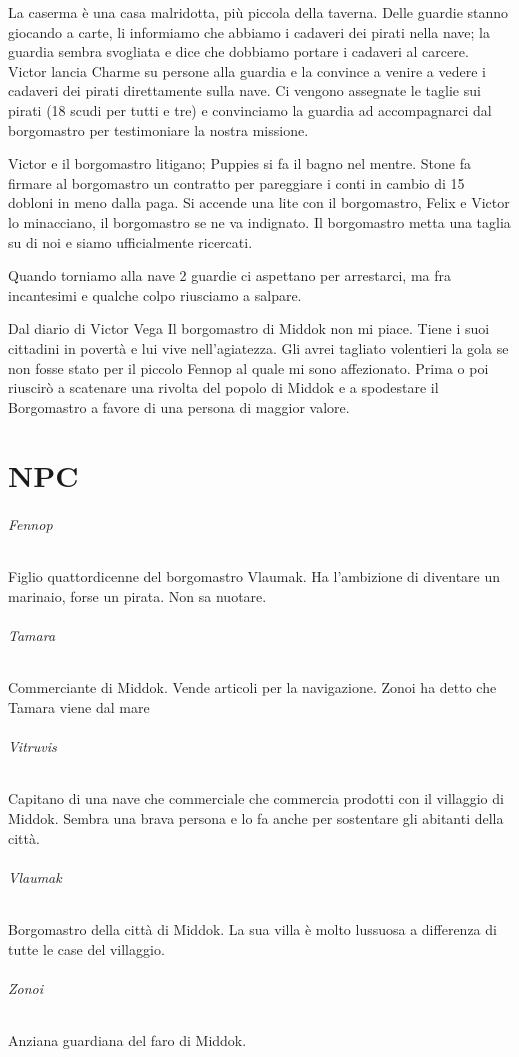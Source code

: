 \documentclass[letterpaper,twocolumn,openany, nodeprecatedcode, nomultitoc]{dndbook}
\begin{document}
La caserma è una casa malridotta, più piccola della taverna. Delle guardie stanno giocando a carte, li informiamo che abbiamo i cadaveri dei pirati nella nave; la guardia sembra svogliata e dice che dobbiamo portare i cadaveri al carcere. Victor lancia Charme su persone alla guardia e la convince a venire a vedere i cadaveri dei pirati direttamente sulla nave. Ci vengono assegnate le taglie sui pirati (18 scudi per tutti e tre) e convinciamo la guardia ad accompagnarci dal borgomastro per testimoniare la nostra missione.

Victor e il borgomastro litigano; Puppies si fa il bagno nel mentre. Stone fa firmare al borgomastro un contratto per pareggiare i conti in cambio di 15 dobloni in meno dalla paga. Si accende una lite con il borgomastro, Felix e Victor lo minacciano, il borgomastro se ne va indignato. Il borgomastro metta una taglia su di noi e siamo ufficialmente ricercati.

Quando torniamo alla nave 2 guardie ci aspettano per arrestarci, ma fra incantesimi e qualche colpo riusciamo a salpare.

\begin{DndComment}{Dal diario di Victor Vega}
Il borgomastro di Middok non mi piace. Tiene i suoi cittadini in povertà e lui vive nell'agiatezza. Gli avrei tagliato volentieri la gola se non fosse stato per il piccolo Fennop al quale mi sono affezionato. Prima o poi riuscirò a scatenare una rivolta del popolo di Middok e a spodestare il Borgomastro a favore di una persona di maggior valore.
\end{DndComment}


\chapter{NPC}

\subparagraph{Fennop} Figlio quattordicenne del borgomastro Vlaumak. Ha l'ambizione di diventare un marinaio, forse un pirata. Non sa nuotare.

\subparagraph{Tamara} Commerciante di Middok. Vende articoli per la navigazione. Zonoi ha detto che Tamara viene dal mare

\subparagraph{Vitruvis} Capitano di una nave che commerciale che commercia prodotti con il villaggio di Middok. Sembra una brava persona e lo fa anche per sostentare gli abitanti della città.

\subparagraph{Vlaumak} Borgomastro della città di Middok. La sua villa è molto lussuosa a differenza di tutte le case del villaggio.

\subparagraph{Zonoi} Anziana guardiana del faro di Middok.
\end{document}
